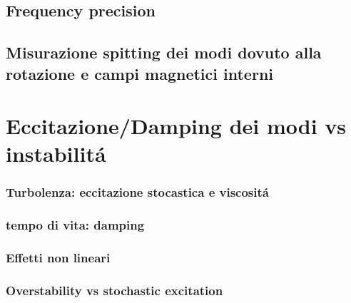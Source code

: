 \documentclass[../main.tex]{subfiles}
\begin{document}
\section{Frequency precision}

\section{Misurazione spitting dei modi dovuto alla rotazione e campi magnetici interni}

\begin{refsection}

\nocite{*}
\begingroup
\let\clearpage\relax
\printbibliography
\endgroup
\end{refsection}
\nocite{*}
\printbibliography[keywords={rotation}]

\chapter{Eccitazione/Damping dei modi vs instabilit\'a}

\subsection{Turbolenza: eccitazione stocastica e viscosit\'a}

\subsection{tempo di vita: damping}

\subsection{Effetti non lineari}

\subsection{Overstability vs stochastic excitation}
\end{document}
